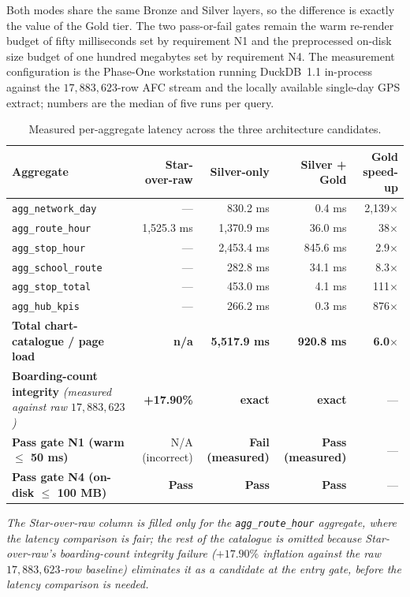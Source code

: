 Both modes share the same Bronze and Silver layers, so the difference
is exactly the value of the Gold tier. The two pass-or-fail gates
remain the warm re-render budget of fifty milliseconds set by
requirement N1 and the preprocessed on-disk size budget of one hundred
megabytes set by requirement N4. The measurement configuration is the
Phase-One workstation running DuckDB~1.1 in-process against the
\(17{,}883{,}623\)-row AFC stream and the locally available
single-day GPS extract; numbers are the median of five runs per query.

\begin{table}[!htbp]
  \centering
  \caption{Measured per-aggregate latency across the three architecture candidates.}
  \label{tab:arch:quantitative}
  \footnotesize
  \renewcommand{\arraystretch}{1.25}
  \begin{tabularx}{\linewidth}{p{4.6cm} r r r r}
    \hline
    \textbf{Aggregate} & \textbf{Star-over-raw} & \textbf{Silver-only} & \textbf{Silver + Gold} & \textbf{Gold speed-up} \\
    \hline
    \texttt{agg\_network\_day}                & ---           &   830.2 ms &    0.4 ms &  2{,}139$\times$ \\
    \texttt{agg\_route\_hour}                 & 1{,}525.3 ms  & 1{,}370.9 ms &   36.0 ms &     38$\times$ \\
    \texttt{agg\_stop\_hour}                  & ---           & 2{,}453.4 ms &  845.6 ms &      2.9$\times$ \\
    \texttt{agg\_school\_route}               & ---           &   282.8 ms &   34.1 ms &      8.3$\times$ \\
    \texttt{agg\_stop\_total}                 & ---           &   453.0 ms &    4.1 ms &    111$\times$  \\
    \texttt{agg\_hub\_kpis}                   & ---           &   266.2 ms &    0.3 ms &    876$\times$  \\
    \hline
    \textbf{Total chart-catalogue / page load} & \textbf{n/a} & \textbf{5{,}517.9 ms} & \textbf{920.8 ms} & \textbf{6.0$\times$} \\
    \hline
    \textbf{Boarding-count integrity} \textit{(measured against raw \(17{,}883{,}623\))}
                                              & \textbf{+17.90\%} & \textbf{exact} & \textbf{exact} & --- \\
    \textbf{Pass gate N1 (warm $\leq$ 50 ms)} & N/A (incorrect) & \textbf{Fail (measured)} & \textbf{Pass (measured)} & --- \\
    \textbf{Pass gate N4 (on-disk $\leq$ 100 MB)} & \textbf{Pass}  & \textbf{Pass} & \textbf{Pass} & --- \\
    \hline
  \end{tabularx}
\par\smallskip
\footnotesize\textit{The Star-over-raw column is filled only for the
\texttt{agg\_route\_hour} aggregate, where the latency comparison is
fair; the rest of the catalogue is omitted because Star-over-raw's
boarding-count integrity failure (\(+17.90\%\) inflation against the
raw \(17{,}883{,}623\)-row baseline) eliminates it as a candidate at
the entry gate, before the latency comparison is needed.}
\end{table}

